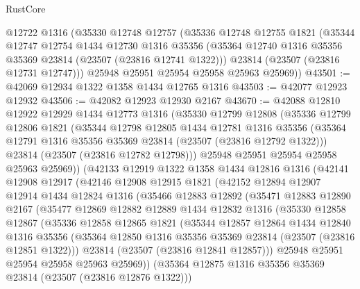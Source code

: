 \begin{lexlean}{RustCore}
\begin{coremodule}
    @12722
    @1316
    (@35330
      @12748
      @12757
      (@35336
        @12748
        @12755
        @1821
        (@35344
          @12747
          @12754
          @1434
          @12730
          @1316
          @35356
          (@35364 @12740 @1316 @35356 @35369 @23814 (@23507 (@23816 @12741 @1322)))
          @23814
          (@23507 (@23816 @12731 @12747)))
        @25948
        @25951
        @25954
        @25958
        @25963
        @25969))
@43501 := @42069 @12934 @1322 @1358 @1434 @12765 @1316
@43503 := @42077 @12923 @12932
@43506 := @42082 @12923 @12930 @2167
@43670 := @42088
    @12810
    @12922
    @12929
    @1434
    @12773
    @1316
    (@35330
      @12799
      @12808
      (@35336
        @12799
        @12806
        @1821
        (@35344
          @12798
          @12805
          @1434
          @12781
          @1316
          @35356
          (@35364 @12791 @1316 @35356 @35369 @23814 (@23507 (@23816 @12792 @1322)))
          @23814
          (@23507 (@23816 @12782 @12798)))
        @25948
        @25951
        @25954
        @25958
        @25963
        @25969))
    (@42133
      @12919
      @1322
      @1358
      @1434
      @12816
      @1316
      (@42141
        @12908
        @12917
        (@42146
          @12908
          @12915
          @1821
          (@42152
            @12894
            @12907
            @12914
            @1434
            @12824
            @1316
            (@35466
              @12883
              @12892
              (@35471
                @12883
                @12890
                @2167
                (@35477
                  @12869
                  @12882
                  @12889
                  @1434
                  @12832
                  @1316
                  (@35330
                    @12858
                    @12867
                    (@35336
                      @12858
                      @12865
                      @1821
                      (@35344
                        @12857
                        @12864
                        @1434
                        @12840
                        @1316
                        @35356
                        (@35364 @12850 @1316 @35356 @35369 @23814 (@23507 (@23816 @12851 @1322)))
                        @23814
                        (@23507 (@23816 @12841 @12857)))
                      @25948
                      @25951
                      @25954
                      @25958
                      @25963
                      @25969))
                  (@35364 @12875 @1316 @35356 @35369 @23814 (@23507 (@23816 @12876 @1322)))

\end{coremodule}
\end{lexlean}
